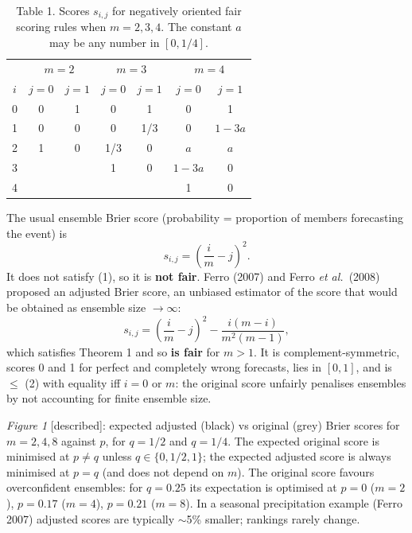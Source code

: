 \documentclass{article}
\begin{document}
\begin{table}[h]
\centering
\caption*{Table 1. Scores $s_{i,j}$ for negatively oriented fair scoring rules
when $m=2,3,4$. The constant $a$ may be any number in $[0,1/4]$.}
\begin{tabular}{c|cc|cc|cc}
 & \multicolumn{2}{c|}{$m=2$} & \multicolumn{2}{c|}{$m=3$} & \multicolumn{2}{c}{$m=4$}\\
$i$ & $j=0$ & $j=1$ & $j=0$ & $j=1$ & $j=0$ & $j=1$\\\hline
0 & 0 & 1 & 0 & 1 & 0 & 1\\
1 & 0 & 0 & 0 & 1/3 & 0 & $1-3a$\\
2 & 1 & 0 & 1/3 & 0 & $a$ & $a$\\
3 &   &   & 1 & 0 & $1-3a$ & 0\\
4 &   &   &   &   & 1 & 0
\end{tabular}
\end{table}

The usual ensemble Brier score (probability = proportion of members forecasting
the event) is
\begin{equation}\tag{2}
  s_{i,j} = \left(\frac{i}{m}-j\right)^2 .
\end{equation}
It does not satisfy (1), so it is \textbf{not fair}. Ferro (2007) and Ferro
\emph{et al.}\ (2008) proposed an adjusted Brier score, an unbiased estimator
of the score that would be obtained as ensemble size $\to\infty$:
\begin{equation}\tag{3}
  s_{i,j} = \left(\frac{i}{m}-j\right)^2 - \frac{i(m-i)}{m^2(m-1)} ,
\end{equation}
which satisfies Theorem 1 and so \textbf{is fair} for $m>1$. It is
complement-symmetric, scores 0 and 1 for perfect and completely wrong
forecasts, lies in $[0,1]$, and is $\le$ (2) with equality iff $i=0$ or $m$:
the original score unfairly penalises ensembles by not accounting for finite
ensemble size.

\emph{Figure 1} [described]: expected adjusted (black) vs original (grey)
Brier scores for $m=2,4,8$ against $p$, for $q=1/2$ and $q=1/4$. The expected
original score is minimised at $p\neq q$ unless $q\in\{0,1/2,1\}$; the expected
adjusted score is always minimised at $p=q$ (and does not depend on $m$).
The original score favours overconfident ensembles: for $q=0.25$ its
expectation is optimised at $p=0$ ($m=2$), $p=0.17$ ($m=4$), $p=0.21$ ($m=8$).
In a seasonal precipitation example (Ferro 2007) adjusted scores are typically
$\sim$5\% smaller; rankings rarely change.
\end{document}

